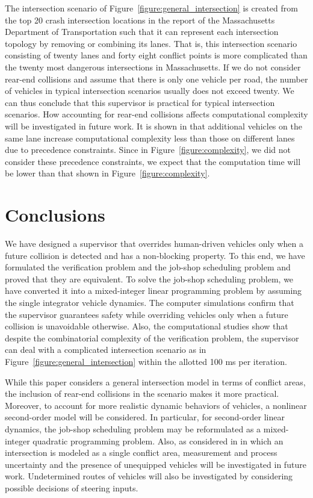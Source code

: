 \documentclass{sig-alternate}
\begin{document}
The intersection scenario of Figure~\ref{figure:general_intersection} is created from the top 20 crash intersection locations in the report of the Massachusetts Department of Transportation \cite{MassDOT_2012_Topcrash} such that it can represent each intersection topology by removing or combining its lanes. That is, this intersection scenario consisting of twenty lanes and forty eight conflict points is more complicated than the twenty most dangerous intersections in Massachusetts. If we do not consider rear-end collisions and assume that there is only one vehicle per road, the number of vehicles in typical intersection scenarios usually does not exceed twenty. We can thus conclude that this supervisor is practical for typical intersection scenarios. How accounting for rear-end collisions affects computational complexity will be investigated in future work. It is shown in \cite{colombo_least_2014} that additional vehicles on the same lane increase computational complexity less than those on different lanes due to precedence constraints. Since in Figure~\ref{figure:complexity}, we did not consider these precedence constraints, we expect that the computation time will be lower than that shown in Figure~\ref{figure:complexity}.

\section{Conclusions}\label{section:conclusions}
We have designed a supervisor that overrides human-driven vehicles only when a future collision is detected and has a non-blocking property. To this end, we have formulated the verification problem and the job-shop scheduling problem and proved that they are equivalent. To solve the job-shop scheduling problem, we have converted it into a mixed-integer linear programming problem by assuming the single integrator vehicle dynamics. The computer simulations confirm that the supervisor guarantees safety while overriding vehicles only when a future collision is unavoidable otherwise. Also, the computational studies show that despite the combinatorial complexity of the verification problem, the supervisor can deal with a complicated intersection scenario as in Figure~\ref{figure:general_intersection} within the allotted 100 ms per iteration. 

While this paper considers a general intersection model in terms of conflict areas, the inclusion of rear-end collisions in the scenario makes it more practical. Moreover, to account for more realistic dynamic behaviors of vehicles, a nonlinear second-order model will be considered. In particular, for second-order linear dynamics, the job-shop scheduling problem may be reformulated as a mixed-integer quadratic programming problem. Also, as considered in \cite{bruni_robust_2013,ahn_supervisory_2014,ahn_experimental_2015} in which an intersection is modeled as a single conflict area, measurement and process uncertainty and the presence of unequipped vehicles will be investigated in future work. Undetermined routes of vehicles will also be investigated by considering possible decisions of steering inputs.
\end{document}
